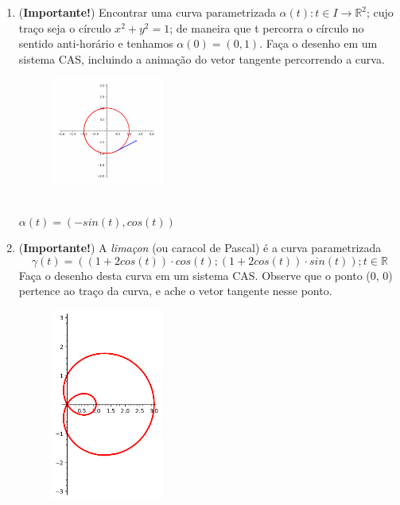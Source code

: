 \documentclass{article}
\begin{document}
\begin{enumerate}
\begin{enumerate}[label=1.\arabic*.]
        \end{enumerate}
    \item (\textbf{Importante!}) Encontrar uma curva parametrizada $\alpha(t) : t \in I \to \mathbb{R}^2$; cujo traço seja o círculo $x^2 + y^2 = 1$; de maneira que t percorra o círculo no sentido anti-horário e tenhamos $\alpha(0) = (0, 1)$. Faça o desenho em um sistema CAS, incluindo a animação do vetor tangente percorrendo a curva. \\    
        \begin{figure}[!h]
            \centering
            \includegraphics[width=0.35\textwidth]{curva_vector.png}
            \label{fig:exercício 2}
        \end{figure}
        \\ $\alpha(t) = (-sin(t), cos(t))$
    \item (\textbf{Importante!}) A \textit{limaçon} (ou caracol de Pascal) é a curva parametrizada \
        $$\gamma(t) = ((1+2cos(t)) \cdot cos(t); (1+2cos(t)) \cdot sin(t)); t \in \mathbb{R}$$
        Faça o desenho desta curva em um sistema CAS. Observe que o ponto (0, 0) pertence ao traço da curva, e ache o vetor tangente nesse ponto. \
        \begin{figure}[!h]
            \centering
            \includegraphics[width=0.35\textwidth]{limacon.png}
            \label{fig:exercício 3}

\end{figure}
\end{enumerate}
\end{document}
